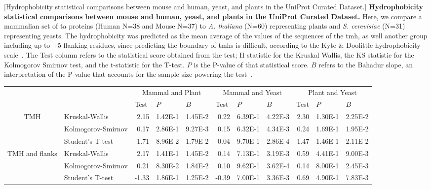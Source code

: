 \begin{table}[htbp]
\centering
{}[Hydrophobicity statistical comparisons between mouse and human, yeast, and plants in the UniProt Curated Dataset.]
{\textbf{Hydrophobicity statistical comparisons between mouse and human, yeast, and plants in the UniProt Curated Dataset.}
Here, we compare a mammalian set of \gls{ta} proteins (Human N=38 and Mouse N=37) to \textit{A. thaliana} (N=60) representing plants  and  \textit{S. cerevisiae} (N=31) representing yeasts.
The hydrophobicity was predicted as the mean average of the values of the sequences of the \gls{tmh}, as well another group including up to $\pm$5 flanking residues, since predicting the boundary of \gls{tmh}s is difficult, according to the Kyte \& Doolittle hydrophobicity scale~\cite{Kyte1982}.
The Test column refers to the statistical score obtained from the test; H statistic for the Kruskal Wallis, the KS statistic for the Kolmogorov Smirnov test, and the t-statistic for the T-test.
$P$ is the P-value of that statistical score.
$B$ refers to the Bahadur slope, an interpretation of the P-value that accounts for the sample size powering the test~\cite{Bahadur1967, Bahadur1971}.}
	\tiny

    \begin{tabular}{clrrrrrrrrr}
	          &       & \multicolumn{3}{c}{Mammal and Plant} & \multicolumn{3}{c}{Mammal and Yeast} & \multicolumn{3}{c}{Plant and Yeast} \\
	          &       & \multicolumn{1}{l}{Test} & \multicolumn{1}{l}{$P$} & \multicolumn{1}{l}{$B$} & \multicolumn{1}{l}{Test} & \multicolumn{1}{l}{$P$} & \multicolumn{1}{l}{$B$} & \multicolumn{1}{l}{Test} & \multicolumn{1}{l}{$P$} & \multicolumn{1}{l}{$B$} \\
	    \multirow{3}[0]{*}{TMH } &  Kruskal-Wallis & 2.15  & 1.42E-1 & 1.45E-2 & 0.22  & 6.39E-1 & 4.22E-3 & 2.30  & 1.30E-1 & 2.25E-2 \\
	          &  Kolmogorov-Smirnov & 0.17  & 2.86E-1 & 9.27E-3 & 0.15  & 6.32E-1 & 4.34E-3 & 0.24  & 1.69E-1 & 1.95E-2 \\
	          &  Student's T-test & -1.71 & 8.96E-2 & 1.79E-2 & 0.04  & 9.70E-1 & 2.86E-4 & 1.47  & 1.46E-1 & 2.11E-2 \\
	    \multirow{3}[0]{*}{TMH and flanks } &  Kruskal-Wallis & 2.17  & 1.41E-1 & 1.45E-2 & 0.14  & 7.13E-1 & 3.19E-3 & 0.59  & 4.41E-1 & 9.00E-3 \\
	          &  Kolmogorov-Smirnov & 0.21  & 8.30E-2 & 1.84E-2 & 0.10  & 9.62E-1 & 3.62E-4 & 0.14  & 8.00E-1 & 2.45E-3 \\
	          &  Student's T-test & -1.33 & 1.86E-1 & 1.25E-2 & -0.39 & 7.00E-1 & 3.36E-3 & 0.69  & 4.90E-1 & 7.83E-3 \\
	    \end{tabular}%
					\label{table:speciestableuniprotstats}
	\end{table}%

